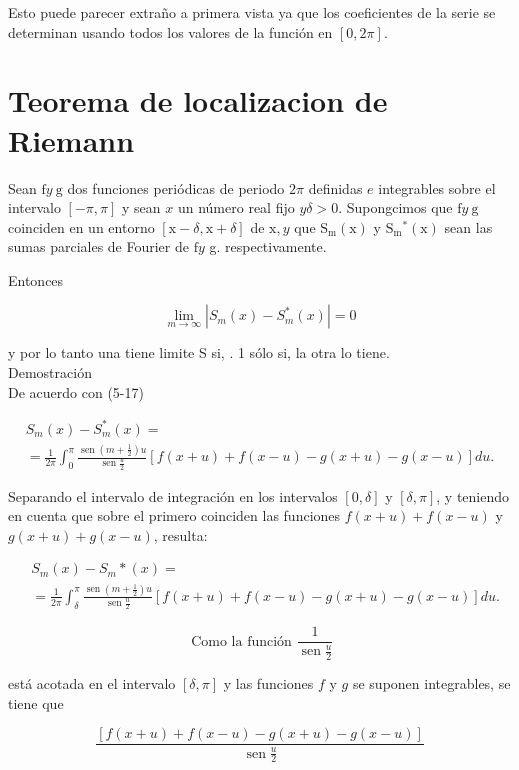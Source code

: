 \documentclass[10pt]{article}
\theoremstyle{plain}
\theoremstyle{definition}
\theoremstyle{remark}
\begin{document}
Esto puede parecer extraño a primera vista ya que los coeficientes de la serie se determinan usando todos los valores de la función en $[0,2 \pi]$.

\section*{Teorema de localizacion de Riemann}
Sean $\mathrm{f} y \mathrm{~g}$ dos funciones periódicas de periodo $2 \pi$ definidas $e$ integrables sobre el intervalo $[-\pi, \pi]$ y sean $x$ un número real fijo $y \delta>0$. Supongcimos que $\mathrm{f} y \mathrm{~g}$ coinciden en un entorno $[\mathrm{x}-\delta, \mathrm{x}+\delta]$ de $\mathrm{x}, y$ que $\mathrm{S}_{\mathrm{m}}(\mathrm{x})$ y $\mathrm{S}_{\mathrm{m}}{ }^{*}(\mathrm{x})$ sean las sumas parciales de Fourier de $\mathrm{f} y$ g. respectivamente.

Entonces

$$
\lim _{m \rightarrow \infty}\left|S_{m}(x)-S_{m}^{*}(x)\right|=0
$$

y por lo tanto una tiene limite S si, . 1 sólo si, la otra lo tiene.\\
Demostración\\
De acuerdo con (5-17)

$$
\begin{gathered}
S_{m}(x)-S_{m}^{*}(x)= \\
=\frac{1}{2 \pi} \int_{0}^{\pi} \frac{\operatorname{sen}\left(m+\frac{1}{2}\right) u}{\operatorname{sen} \frac{u}{2}}[f(x+u)+f(x-u)-g(x+u)-g(x-u)] d u .
\end{gathered}
$$

Separando el intervalo de integración en los intervalos $[0, \delta]$ y $[\delta, \pi]$, y teniendo en cuenta que sobre el primero coinciden las funciones $f(x+u)+f(x-u)$ y $g(x+u)+g(x-u)$, resulta:

$$
\begin{aligned}
& S_{m}(x)-S_{m} *(x)= \\
& =\frac{1}{2 \pi} \int_{\delta}^{\pi} \frac{\operatorname{sen}\left(m+\frac{1}{2}\right) u}{\operatorname{sen} \frac{u}{2}}[f(x+u)+f(x-u)-g(x+u)-g(x-u)] d u .
\end{aligned}
$$

$$
\text { Como la función } \frac{1}{\operatorname{sen} \frac{u}{2}}
$$

está acotada en el intervalo $[\delta, \pi]$ y las funciones $f$ y $g$ se suponen integrables, se tiene que

$$
\frac{[f(x+u)+f(x-u)-g(x+u)-g(x-u)]}{\operatorname{sen} \frac{u}{2}}
$$
\end{document}
